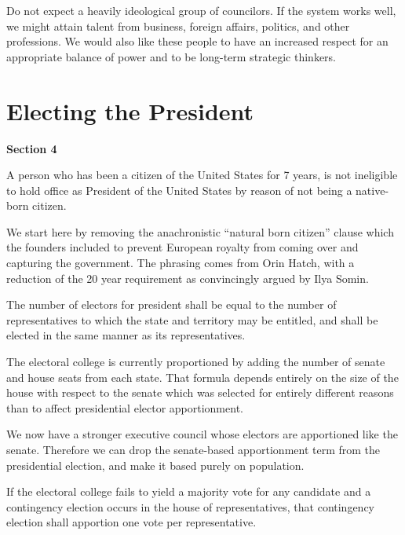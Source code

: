 \documentclass{article}
\begin{document}
Do not expect a heavily ideological group of councilors. If the system works well, we might attain talent from business, foreign affairs, politics, and other professions. We would also like these people to have an increased respect for an appropriate balance of power and to be long-term strategic thinkers.

\section{Electing the President}

\begin{quoting}
\textbf{Section 4}

A person who has been a citizen of the United States for 7 years, is not ineligible to hold office as President of the United States by reason of not being a native-born citizen.
\end{quoting}

We start here by removing the anachronistic “natural born citizen” clause which the founders included to prevent European royalty from coming over and capturing the government. The phrasing comes from Orin Hatch\cite{Somin_Hatch}, with a reduction of the 20 year requirement as convincingly argued by Ilya Somin\cite{Somin_NBC}.

\begin{quoting}
The number of electors for president shall be equal to the number of representatives to which the state and territory may be entitled, and shall be elected in the same manner as its representatives.
\end{quoting}

The electoral college is currently proportioned by adding the number of senate and house seats from each state. That formula depends entirely on the size of the house with respect to the senate which was selected for entirely different reasons than to affect presidential elector apportionment.

We now have a stronger executive council whose electors are apportioned like the senate. Therefore we can drop the senate-based apportionment term from the presidential election, and make it based purely on population.

\begin{quoting}
If the electoral college fails to yield a majority vote for any candidate and a contingency election occurs in the house of representatives, that contingency election shall apportion one vote per representative.
\end{quoting}
\end{document}
